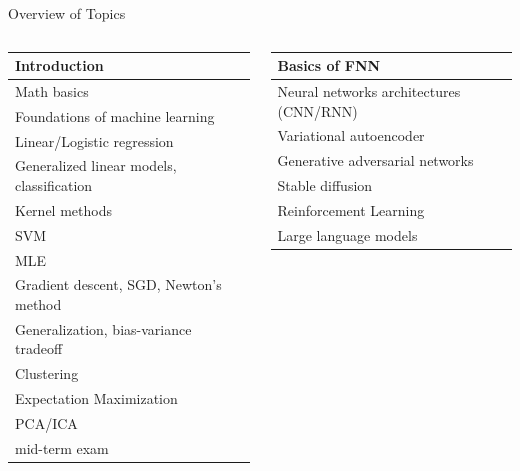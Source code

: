 \documentclass[aspectratio=169,12pt]{beamer}
\begin{document}
\begin{frame}[t]{Overview of Topics}
  \vspace{-0.18cm}
  \renewcommand{\arraystretch}{1.08}
  \begin{columns}[T,onlytextwidth]
      \scriptsize
      \begin{tabular}{|>{\raggedright\arraybackslash}p{0.93\linewidth}|}
        \hline
        Introduction \\ \hline
        Math basics \\ \hline
        Foundations of machine learning \\ \hline
        Linear/Logistic regression \\ \hline
        Generalized linear models, classification \\ \hline
        Kernel methods \\ \hline
        SVM \\ \hline
        MLE\\ \hline
        Gradient descent, SGD, Newton's method \\ \hline
        Generalization, bias-variance tradeoff \\ \hline
        Clustering \\ \hline
        Expectation Maximization \\ \hline
        PCA/ICA \\ \hline
        mid-term exam \\ \hline
      \end{tabular}

      \vspace{0.95cm}
      \scriptsize
      \begin{tabular}{|>{\raggedright\arraybackslash}p{0.93\linewidth}|}
        \hline
        Basics of FNN\\ \hline
        Neural networks architectures (CNN/RNN) \\ \hline
        Variational autoencoder \\ \hline
        Generative adversarial networks \\ \hline
        Stable diffusion \\ \hline
        Reinforcement Learning \\ \hline
        Large language models \\ \hline
      \end{tabular}
  \end{columns}
\end{frame}
\end{document}

